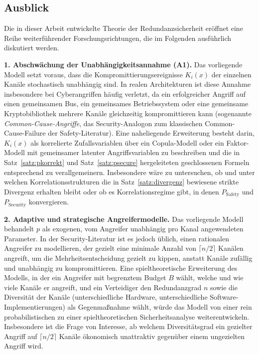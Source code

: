 ﻿\documentclass[a4paper,12pt]{article}
\theoremstyle{definition}
\begin{document}
\subsection{Ausblick}

Die in dieser Arbeit entwickelte Theorie der Redundanzsicherheit eröffnet eine Reihe weiterführender Forschungsrichtungen, die im Folgenden ausführlich diskutiert werden.

\textbf{1. Abschwächung der Unabhängigkeitsannahme (A1).} Das vorliegende Modell setzt voraus, dass die Kompromittierungsereignisse $K_i(x)$ der einzelnen Kanäle stochastisch unabhängig sind. In realen Architekturen ist diese Annahme insbesondere bei Cyberangriffen häufig verletzt, da ein erfolgreicher Angriff auf einen gemeinsamen Bus, ein gemeinsames Betriebssystem oder eine gemeinsame Kryptobibliothek mehrere Kanäle gleichzeitig kompromittieren kann (sogenannte \emph{Common-Cause-Angriffe}, das Security-Analogon zum klassischen Common-Cause-Failure der Safety-Literatur). Eine naheliegende Erweiterung besteht darin, $K_i(x)$ als korrelierte Zufallsvariablen über ein Copula-Modell oder ein Faktor-Modell mit gemeinsamer latenter Angriffsvariablen zu beschreiben und die in Satz~\ref{satz:pkorrekt} und Satz~\ref{satz:psecure} hergeleiteten geschlossenen Formeln entsprechend zu verallgemeinern. Insbesondere wäre zu untersuchen, ob und unter welchen Korrelationsstrukturen die in Satz~\ref{satz:divergenz} bewiesene strikte Divergenz erhalten bleibt oder ob es Korrelationsregime gibt, in denen $P_{\mathrm{Safety}}$ und $P_{\mathrm{Security}}$ konvergieren.

\textbf{2. Adaptive und strategische Angreifermodelle.} Das vorliegende Modell behandelt $p$ als exogenen, vom Angreifer unabhängig pro Kanal angewendeten Parameter. In der Security-Literatur ist es jedoch üblich, einen rationalen Angreifer zu modellieren, der gezielt eine minimale Anzahl von $\lceil n/2 \rceil$ Kanälen angreift, um die Mehrheitsentscheidung gezielt zu kippen, anstatt Kanäle zufällig und unabhängig zu kompromittieren. Eine spieltheoretische Erweiterung des Modells, in der ein Angreifer mit begrenztem Budget $B$ wählt, welche und wie viele Kanäle er angreift, und ein Verteidiger den Redundanzgrad $n$ sowie die Diversität der Kanäle (unterschiedliche Hardware, unterschiedliche Software-Implementierungen) als Gegenmaßnahme wählt, würde das Modell von einer rein probabilistischen zu einer spieltheoretischen Sicherheitsanalyse weiterentwickeln. Insbesondere ist die Frage von Interesse, ab welchem Diversitätsgrad ein gezielter Angriff auf $\lceil n/2\rceil$ Kanäle ökonomisch unattraktiv gegenüber einem ungezielten Angriff wird.
\end{document}
